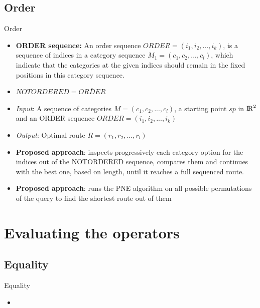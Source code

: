 \documentclass[18pt]{beamer}
\begin{document}
		
	
	\subsection{Order}
		\begin{frame}{Order}
		
			\begin{itemize}
				\item \textbf{ORDER sequence:} An order sequence $ORDER = (i_1, i_2, ..., i_k)$, is a sequence of indices in a category sequence $M_1 = (c_1, c_2, ..., c_l)$, which indicate that the categories at the given indices should remain in the fixed positions in this category sequence.
				\item $NOTORDERED = \overline{ORDER}$ 
				\item \textit{Input}: A sequence of categories $M = (c_1, c_2, ..., c_l)$, a starting point $sp$ in ${\rm I\!R}^2$ and an ORDER sequence $ORDER = (i_1, i_2, ..., i_k)$
				\item \textit{Output}: Optimal route $R = (r_1, r_2, ..., r_l)$ 
				\item \textbf{Proposed approach}: inspects progressively each category option for the indices out of the NOTORDERED sequence, compares them and continues with the best one, based on length, until it reaches a full sequenced route.
				\item \textbf{Proposed approach}: runs the PNE algorithm on all possible permutations of the query to find the shortest route out of them
			\end{itemize}
		
		\end{frame}
	
		
	
\section{Evaluating the operators}

	\subsection{Equality}
		\begin{frame}{Equality}
		
			\begin{itemize}
				\item
			\end{itemize}
		
		\end{frame}
	
\end{document}
